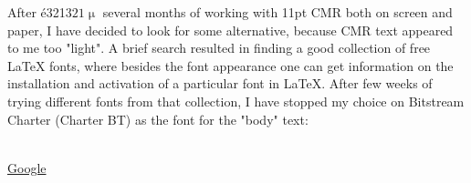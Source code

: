 \documentclass{reportex}
\begin{document}
\tableofcontents                      %
\listoffigures                        %


After é321$321\upmu$ several months of working with 11pt CMR both on screen and paper, I have decided to look for some alternative, because CMR text appeared to me too "light". A brief search resulted in finding a good collection of free LaTeX fonts, where besides the font appearance one can get information on the installation and activation of a particular font in LaTeX. After few weeks of trying different fonts from that collection, I have stopped my choice on Bitstream Charter (Charter BT) as the font for the "body" text:

\\
\href{http://www.google.com}{Google}
\end{document}

